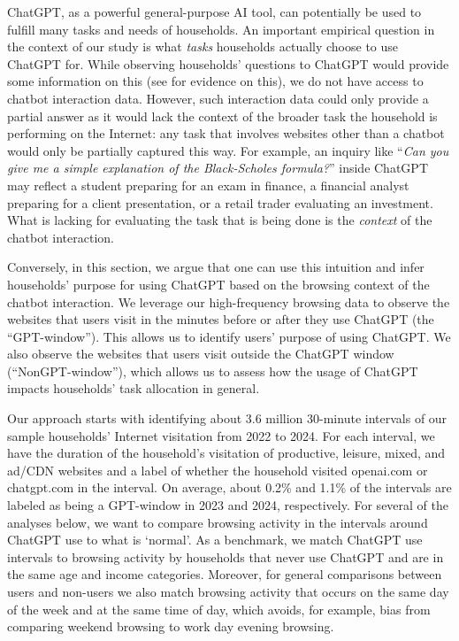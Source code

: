 \documentclass[12pt]{article}
\begin{document}
\noindent ChatGPT, as a powerful general-purpose AI tool, can potentially be used to fulfill many tasks and needs of households. An important empirical question in the context of our study is what \textit{tasks} households actually choose to use ChatGPT for. While observing households' questions to ChatGPT would provide some information on this (see \cite{chatterji_how_2025} for evidence on this), we do not have access to chatbot interaction data. However, such interaction data could only provide a partial answer as it would lack the context of the broader task the household is performing on the Internet: any task that involves websites other than a chatbot would only be partially captured this way.
For example, an inquiry like ``\textit{Can you give me a simple explanation of the Black-Scholes formula?}'' inside ChatGPT may reflect a student preparing for an exam in finance, a financial analyst preparing for a client presentation, or a retail trader evaluating an investment. What is lacking for evaluating the task that is being done is the \textit{context} of the chatbot interaction.

Conversely, in this section, we argue that one can use this intuition and infer households' purpose for using ChatGPT based on the browsing context of the chatbot interaction. We leverage our high-frequency browsing data to observe the websites that users visit in the minutes before or after they use ChatGPT (the ``GPT-window''). This allows us to identify users' purpose of using ChatGPT. We also observe the websites that users visit outside the ChatGPT window (``NonGPT-window''), which allows us to assess how the usage of ChatGPT impacts households' task allocation in general. 

Our approach starts with identifying about 3.6 million 30-minute intervals of our sample households' Internet visitation from 2022 to 2024. For each interval, we have the duration of the household's visitation of productive, leisure, mixed, and ad/CDN websites and a label of whether the household visited openai.com or chatgpt.com in the interval. On average, about 0.2\%  and 1.1\% of the intervals are labeled as being a GPT-window in 2023 and 2024, respectively.  For several of the analyses below, we want to compare browsing activity in the intervals around ChatGPT use to what is `normal'. As a benchmark, we match ChatGPT use intervals to browsing activity by households that never use ChatGPT and are in the same age and income categories. Moreover, for general comparisons between users and non-users we also match browsing activity that occurs on the same day of the week and at the same time of day, which avoids, for example, bias from comparing weekend browsing to work day evening browsing.
\end{document}
